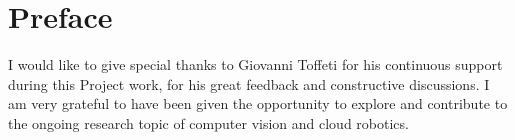\chapter*{Preface}
I would like to give special thanks to Giovanni Toffeti for his continuous support during this Project work, for his great feedback and constructive discussions. I am very grateful to have been given the opportunity to explore and contribute to the ongoing research topic of computer vision and cloud robotics.  
